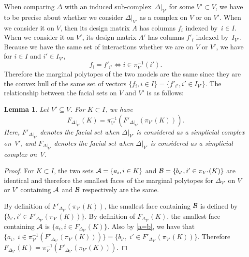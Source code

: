 \documentclass[aos,noinfoline]{imsart}
\newcommand{\face}{F}
\newtheorem{lemma}[theorem]{Lemma}
\theoremstyle{remark}
\theoremstyle{definition}
\begin{document}
When comparing $\Delta$ with an induced sub-complex~$\Delta|_{V'}$ for some $V'\subset V$, we have to be precise about whether we consider $\Delta|_{V'}$ as a complex
on $V$ or on $V'$.  When we consider it on $V$, then its design matrix ${A}$ has columns $f_{i}$ indexed by~$i\in I$.
When we consider it on $V'$, its design matrix $A'$ has columns $f'_{i}$ indexed by~$I_{V'}$.
Because we have the same set of interactions whether we are on $V$ or $V'$, we have for $i\in I$ and $i'\in
I_{V'}$,
\begin{equation}
\label{a=b}
f_i=f'_{i'} \Leftrightarrow  i\in \pi_{V'}^{-1}(i').
\end{equation}
Therefore the marginal polytopes of the two models are the same since they are the convex hull of the same set of vectors $\{f_i, i\in I\}=\{f'_{i'}, i'\in I_{V'}\}$. The relationship between the facial sets on $V$ and $V'$ is as follows:
\begin{lemma}
  \label{lem:facial-subcomplex}
  Let $V'\subseteq V$.  For $K\subset I$, we have 
  $$\face_{\Delta|_{V'}}(K) = \pi_{V'}^{-1}(\face'_{\Delta|_{V'}}(\pi_{V'}(K))).$$
  Here, $\face'_{\Delta|_{V'}}$ denotes the facial set when $\Delta|_{V'}$ is considered as a simplicial complex on~$V'$,
  and $\face_{\Delta|_{V'}}$ denotes the facial set when $\Delta|_{V'}$ is considered as a simplicial complex on~$V$.
\end{lemma}
\begin{proof}
For $K\subset I$, the two sets ${\cal A}=\{a_i, i\in K\}$ and ${\cal B}=\{b_{i'}, i'\in \pi_{V'}(K)\}$ are identical and therefore the smallest faces of the marginal polytopes for $\Delta_{V'}$  on $V$ or $V'$ containing ${\cal A}$ and ${\cal B}$ respectively are the same. 

By definition of $F'_{\Delta_{V'}}(\pi_{V'}(K))$, the smallest face containing $\cal{B}$ is defined by $\{b_{i'}, i'\in F'_{\Delta_{V'}}(\pi_{V'}(K))\}$. By definition of $F_{\Delta_{V'}}(K)$, the smallest face containing $\cal{A}$ is $\{a_i, i\in F_{\Delta_{V'}}(K)\}$. 
Also by \eqref{a=b}, we have that 
$\{a_i, \;i\in \pi_{V'}^{-1}(F'_{\Delta_{V'}}(\pi_{V'}(K)))\}=\{b_{i'},\;{i'}\in F'_{\Delta_{V'}}(\pi_{V'}(K))\}.$
Therefore
$F_{\Delta_{V'}}(K)=\pi_{V'}^{-1}(F'_{\Delta_{V'}}(\pi_{V'}(K))).$
\end{proof}

\end{document}
